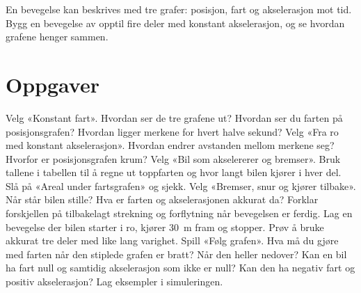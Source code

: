 \documentclass[11pt]{article}
\begin{document}

En bevegelse kan beskrives med tre grafer: posisjon, fart og akselerasjon mot tid. Bygg en bevegelse av opptil fire deler med konstant akselerasjon, og se hvordan grafene henger sammen.

\section*{Oppgaver}

\begin{oppgaveliste}
\oppgave {}Velg «Konstant fart». Hvordan ser de tre grafene ut? Hvordan ser du farten på posisjonsgrafen? Hvordan ligger merkene for hvert halve sekund?
\svar
\oppgave {}Velg «Fra ro med konstant akselerasjon». Hvordan endrer avstanden mellom merkene seg? Hvorfor er posisjonsgrafen krum?
\svar
\oppgave {}Velg «Bil som akselererer og bremser». Bruk tallene i tabellen til å regne ut toppfarten og hvor langt bilen kjører i hver del. Slå på «Areal under fartsgrafen» og sjekk.
\svar
\oppgave {}Velg «Bremser, snur og kjører tilbake». Når står bilen stille? Hva er farten og akselerasjonen akkurat da? Forklar forskjellen på tilbakelagt strekning og forflytning når bevegelsen er ferdig.
\svar
\oppgave {}Lag en bevegelse der bilen starter i ro, kjører 30~m fram og stopper. Prøv å bruke akkurat tre deler med like lang varighet.
\svar
\oppgave {}Spill «Følg grafen». Hva må du gjøre med farten når den stiplede grafen er bratt? Når den heller nedover?
\svar
\oppgave {}Kan en bil ha fart null og samtidig akselerasjon som ikke er null? Kan den ha negativ fart og positiv akselerasjon? Lag eksempler i simuleringen.
\svar
\end{oppgaveliste}
\end{document}
